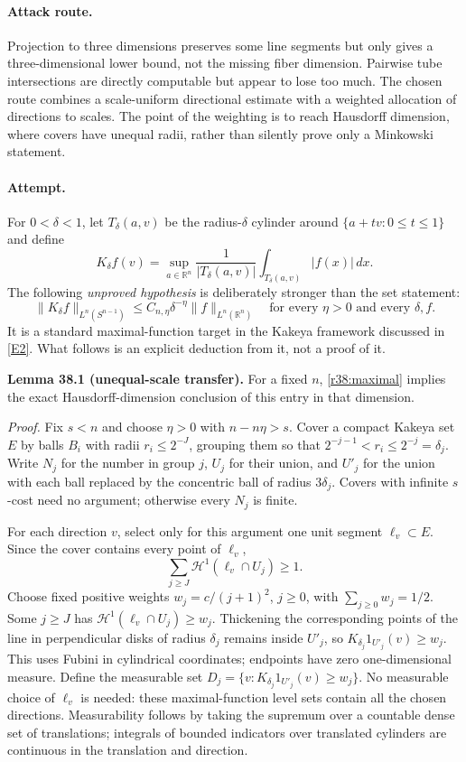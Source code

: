 \documentclass[11pt,a4paper]{article}
\newcommand{\R}{\mathbb{R}}
\newcommand{\eref}[2]{\hyperlink{extra:#1:#2}{[E#2]}}
\numberwithin{equation}{section}
\begin{document}
\paragraph{Attack route.}
Projection to three dimensions preserves some line segments but only gives
a three-dimensional lower bound, not the missing fiber dimension. Pairwise
tube intersections are directly computable but appear to lose too much.
The chosen route combines a scale-uniform directional estimate with a
weighted allocation of directions to scales. The point of the weighting is
to reach Hausdorff dimension, where covers have unequal radii, rather than
silently prove only a Minkowski statement.

\paragraph{Attempt.}
For $0<\delta<1$, let $T_\delta(a,v)$ be the radius-$\delta$ cylinder around
$\{a+tv:0\le t\le1\}$ and define
\[
 K_\delta f(v)=\sup_{a\in\R^n}\frac1{|T_\delta(a,v)|}
                      \int_{T_\delta(a,v)}|f(x)|\,dx.
\]
The following \emph{unproved hypothesis} is deliberately stronger than the
set statement:
\begin{equation}\label{r38:maximal}
 \|K_\delta f\|_{L^n(S^{n-1})}
 \le C_{n,\eta}\delta^{-\eta}\|f\|_{L^n(\R^n)}
 \quad\text{for every }\eta>0\text{ and every }\delta,f.
\end{equation}
It is a standard maximal-function target in the Kakeya framework discussed
in \eref{30006573}{2}. What follows is an explicit deduction from it, not a proof
of it.

\textbf{Lemma 38.1 (unequal-scale transfer).}
For a fixed $n$, \eqref{r38:maximal} implies the exact Hausdorff-dimension
conclusion of this entry in that dimension.

\emph{Proof.}
Fix $s<n$ and choose $\eta>0$ with $n-n\eta>s$. Cover a compact Kakeya set
$E$ by balls $B_i$ with radii $r_i\le2^{-J}$, grouping them so that
$2^{-j-1}<r_i\le2^{-j}=\delta_j$. Write $N_j$ for the number in group $j$,
$U_j$ for their union, and $U'_j$ for the union with each ball replaced by
the concentric ball of radius $3\delta_j$. Covers with infinite $s$-cost
need no argument; otherwise every $N_j$ is finite.

For each direction $v$, select only for this argument one unit segment
$\ell_v\subset E$. Since the cover contains every point of $\ell_v$,
\[
 \sum_{j\ge J}\mathcal H^1(\ell_v\cap U_j)\ge1.
\]
Choose fixed positive weights $w_j=c/(j+1)^2$, $j\ge0$, with
$\sum_{j\ge0}w_j=1/2$. Some $j\ge J$ has
$\mathcal H^1(\ell_v\cap U_j)\ge w_j$. Thickening the corresponding points
of the line in perpendicular disks of radius $\delta_j$ remains inside
$U'_j$, so $K_{\delta_j}1_{U'_j}(v)\ge w_j$. This uses Fubini in cylindrical
coordinates; endpoints have zero one-dimensional measure.
Define the measurable set
$D_j=\{v:K_{\delta_j}1_{U'_j}(v)\ge w_j\}$. No measurable choice of
$\ell_v$ is needed: these maximal-function level sets contain all the chosen
directions. Measurability follows by taking the supremum over a countable
dense set of translations; integrals of bounded indicators over translated
cylinders are continuous in the translation and direction.
\end{document}
